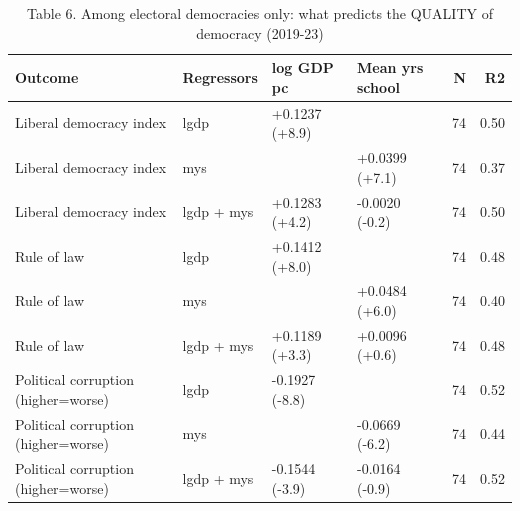\begin{table}
\caption{Table 6. Among electoral democracies only: what predicts the QUALITY of democracy (2019-23)}
\label{tab:T6_quality_of_democracy}
\begin{tabular}{llllrr}
\toprule
Outcome & Regressors & log GDP pc & Mean yrs school & N & R2 \\
\midrule
Liberal democracy index & lgdp & +0.1237 (+8.9) &  & 74 & 0.50 \\
Liberal democracy index & mys &  & +0.0399 (+7.1) & 74 & 0.37 \\
Liberal democracy index & lgdp + mys & +0.1283 (+4.2) & -0.0020 (-0.2) & 74 & 0.50 \\
Rule of law & lgdp & +0.1412 (+8.0) &  & 74 & 0.48 \\
Rule of law & mys &  & +0.0484 (+6.0) & 74 & 0.40 \\
Rule of law & lgdp + mys & +0.1189 (+3.3) & +0.0096 (+0.6) & 74 & 0.48 \\
Political corruption (higher=worse) & lgdp & -0.1927 (-8.8) &  & 74 & 0.52 \\
Political corruption (higher=worse) & mys &  & -0.0669 (-6.2) & 74 & 0.44 \\
Political corruption (higher=worse) & lgdp + mys & -0.1544 (-3.9) & -0.0164 (-0.9) & 74 & 0.52 \\
\bottomrule
\end{tabular}
\end{table}
